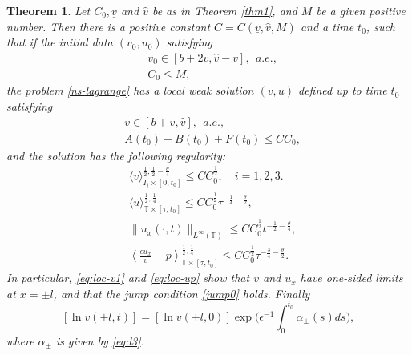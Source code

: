 \documentclass[a4paper,oneside,11pt]{article}
\numberwithin{equation}{section}
\newtheorem{theorem}{Theorem}[section]
\begin{document}
\begin{theorem}%
\label{thm:loc}
	Let $C_0, \underline{v}$ and $\hat{v}$ be as in Theorem \ref{thm1}, and  $M$ be a given positive number. Then there is a positive constant $C=C(\underline{v}, \hat{v}, M)$ and a time $t_0$, such that if the initial data \((v_0,u_0)\) satisfying
	\begin{align}
		& v_0\in [b+2\underline{v},\hat{v}-\underline{v}], ~~a.e., \label{eq:v-b0}\\
		& C_0 \leq M, \label{eq:c0-b0} %
	\end{align}
	the problem \eqref{ns-lagrange} has a local weak solution \((v,u)\) defined up to time $t_0$ satisfying
	\begin{align}
		& v\in [b+\underline{v},\hat{v}], ~~a.e., \label{eq:v-b1}\\
		& A(t_0)+B(t_0)+F(t_0)\leq C C_0, \label{eq:c0-b1}
	\end{align}
	and the solution has the following regularity:
	\begin{align}
		&\langle v\rangle_{I_i\times[0,t_{0}]}^{\frac{1}{2},\frac{1}{2}-\frac{\theta}{4}}\leq CC_{0}^{\frac{1}{2}},\quad i=1,2,3.\label{eq:loc-v1}\\		
		&\langle u\rangle_{\mathbb{T}\times[\tau,t_{0}]}^{\frac{1}{2},\frac{1}{4}} \leq CC_{0}^{\frac12}\tau^{-\frac{1}{4}-\frac{\theta}{2}},\label{eq:loc-u1} \\
		&\|u_{x}(\cdot,t)\|_{L^{\infty}(\mathbb{T})} \leq CC_{0}^{\frac{1}{2}}t^{-\frac{1}{2}-\frac{\theta}{4}}, \label{eq:loc-u2}\\
		&\left\langle\frac{\epsilon u_{x}}{v}-p\right\rangle_{\mathbb{T}\times[\tau,t_{0}]}^{\frac{1}{2},\frac{1}{4}} \leq CC_{0}^{\frac12}\tau^{-\frac{3}{4}-\frac{\theta}{2}}.\label{eq:loc-up} 
	\end{align}
In particular, \eqref{eq:loc-v1} and \eqref{eq:loc-up} show that \(v\) and \(u_{x}\) have one-sided limits at \(x=\pm l\), and that the jump condition \eqref{jump0} holds. Finally
	\begin{equation}\label{eq:jump-loc}
		[\ln v(\pm l,t)]=[\ln v(\pm l,0)]\exp\Big(\epsilon^{-1}\int_{0}^{t_0}\alpha_{\pm}(s)ds\Big),
	\end{equation}
	where \(\alpha_{\pm}\) is given by \eqref{eq:l3}.
\end{theorem}
\end{document}
